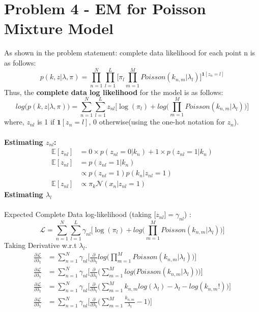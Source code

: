 \documentclass{article}
\begin{document}
\section{Problem 4 - EM for Poisson Mixture Model}
As shown in the problem statement: complete data likelihood for each point n is as follows:
$$p(k,z |  \lambda, \pi) = \prod_{n=1}^N\prod_{l=1}^L\Bigg[\pi_l\prod_{m=1}^M Poisson(k_{n,m}|\lambda_l)\Bigg]^{\textbf{1}[z_n=l]}$$
Thus, the \textbf{complete data log likelihood} for the model is as follows:
$$ log\big(p(k,z |  \lambda, \pi)\big) = \sum_{n=1}^N\sum_{l=1}^Lz_{nl}\Bigg[\log(\pi_l)+ log\bigg(\prod_{m=1}^M Poisson(k_{n,m}|\lambda_l)\bigg)\Bigg]$$
where, $z_{nl}$ is 1 if $\textbf{1}[z_n=l]$, 0 otherwise(using the one-hot notation for $z_n$). \\ \\
\textbf{Estimating $z_{nl}$: }
\begin{equation*}
\begin{aligned}
\mathds{E}[z_{nl}] &= 0 \times p(z_{nl}=0|k_n) + 1 \times p(z_{nl} =1 |k_n) \\
\mathds{E}[z_{nl}] &= p(z_{nl} =1 |k_n) \\
&\propto  p(z_{nl}=1)p(k_n|z_{nl}=1)\\
\mathds{E}[z_{nl}] &\propto \pi_k \mathcal{N}(x_n | z_{nl}=1)
\end{aligned}
\end{equation*}
\textbf{Estimating $\lambda_l$} \\ \\
Expected Complete Data log-likelihood (taking $\mathds[z_{nl}] = \gamma_{nl}$) : 
$$ \mathcal{L} =  \sum_{n=1}^N\sum_{l=1}^L\gamma_{nl}\Bigg[\log(\pi_l)+ log\bigg(\prod_{m=1}^M Poisson(k_{n,m}|\lambda_l)\bigg)\Bigg] $$
Taking Derivative w.r.t $\lambda_l$.
\begin{equation*}
\begin{aligned}
\frac{\partial \mathcal{L}}{\partial \lambda_l} &=  \sum_{n=1}^N\gamma_{nl}\Bigg[\frac{\partial}{\partial \lambda_l}  log\bigg(\prod_{m=1}^M Poisson(k_{n,m}|\lambda_l)\bigg)\Bigg]  \\
\frac{\partial \mathcal{L}}{\partial \lambda_l} &=  \sum_{n=1}^N\gamma_{nl}\Bigg[\frac{\partial}{\partial \lambda_l} \bigg(\sum_{m=1}^Mlog\bigg( Poisson(k_{n,m}|\lambda_l)\bigg)\bigg)\Bigg]  \\
\frac{\partial \mathcal{L}}{\partial \lambda_l} &=  \sum_{n=1}^N\gamma_{nl}\Bigg[\frac{\partial}{\partial \lambda_l} \bigg(\sum_{m=1}^M k_{n,m}log(\lambda_l) - \lambda_l - log(k_{n,m}!) \bigg)\Bigg]  \\
\frac{\partial \mathcal{L}}{\partial \lambda_l} &=  \sum_{n=1}^N\gamma_{nl}\Bigg[\frac{\partial}{\partial \lambda_l} \bigg(\sum_{m=1}^M \frac{k_{n,m}}{\lambda_l} - 1 \bigg)\Bigg]  \\
\end{aligned}
\end{equation*}
\end{document}
